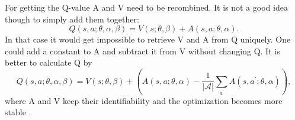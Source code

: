 For getting the Q-value A and V need to be recombined. It is not a good idea though to simply add them together:
\begin{equation}
Q(s, a ; \theta, \alpha, \beta)=V(s ; \theta, \beta)+A(s, a ; \theta, \alpha).
\end{equation}
In that case it would get impossible to retrieve V and A from Q uniquely. One could add a constant to A and subtract it from V without changing Q.
It is better to calculate Q by
\begin{equation}
Q(s, a ; \theta, \alpha, \beta)=V(s ; \theta, \beta)+ \left(A(s, a ; \theta, \alpha)-\frac{1}{|\mathcal{A}|} \sum_{a^{\prime}} A\left(s, a^{\prime} ; \theta, \alpha\right)\right),
\end{equation}
where A and V keep their identifiability and the optimization becomes more stable \cite{DBLP:journals/corr/WangFL15}.
